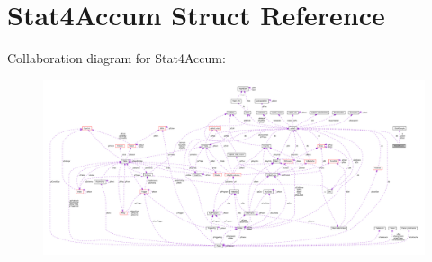 \hypertarget{structStat4Accum}{}\section{Stat4\+Accum Struct Reference}
\label{structStat4Accum}


Collaboration diagram for Stat4\+Accum\+:\nopagebreak
\begin{figure}[H]
\begin{center}
\leavevmode
\includegraphics[width=350pt]{structStat4Accum__coll__graph}
\end{center}
\end{figure}
